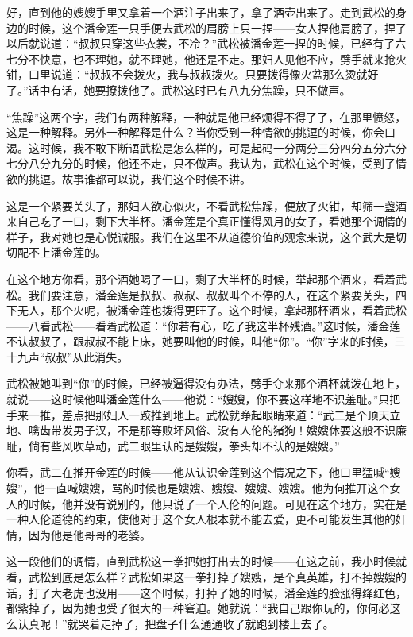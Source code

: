 \par 好，直到他的嫂嫂手里又拿着一个酒注子出来了，拿了酒壶出来了。走到武松的身边的时候，这个潘金莲一只手便去武松的肩膀上只一捏——女人捏他肩膀了，捏了以后就说道：“叔叔只穿这些衣裳，不冷？”武松被潘金莲一捏的时候，已经有了六七分不快意，也不理她，就不理她，他还是不走。那妇人见他不应，劈手就来抢火钳，口里说道：“叔叔不会拨火，我与叔叔拨火。只要拨得像火盆那么烫就好了。”话中有话，她要撩拨他了。武松这时已有八九分焦躁，只不做声。
\par “焦躁”这两个字，我们有两种解释，一种就是他已经烦得不得了了，在那里愤怒，这是一种解释。另外一种解释是什么？当你受到一种情欲的挑逗的时候，你会口渴。这时候，我不敢下断语武松是怎么样的，可是起码一分两分三分四分五分六分七分八分九分的时候，他还不走，只不做声。我认为，武松在这个时候，受到了情欲的挑逗。故事谁都可以说，我们这个时候不讲。
\par 这是一个紧要关头了，那妇人欲心似火，不看武松焦躁，便放了火钳，却筛一盏酒来自己吃了一口，剩下大半杯。潘金莲是个真正懂得风月的女子，看她那个调情的样子，我对她也是心悦诚服。我们在这里不从道德价值的观念来说，这个武大是切切配不上潘金莲的。
\par 在这个地方你看，那个酒她喝了一口，剩了大半杯的时候，举起那个酒来，看着武松。我们要注意，潘金莲是叔叔、叔叔、叔叔叫个不停的人，在这个紧要关头，四下无人，那个火呢，被潘金莲也拨得更旺了。这个时候，拿起那杯酒来，看着武松——八看武松——看着武松道：“你若有心，吃了我这半杯残酒。”这时候，潘金莲不认叔叔了，跟叔叔不能上床，她要叫他的时候，叫他“你”。“你”字来的时候，三十九声“叔叔”从此消失。
\par 武松被她叫到“你”的时候，已经被逼得没有办法，劈手夺来那个酒杯就泼在地上，就说——这时候他叫潘金莲什么——他说：“嫂嫂，你不要这样地不识羞耻。”只把手来一推，差点把那妇人一跤推到地上。武松就睁起眼睛来道：“武二是个顶天立地、噙齿带发男子汉，不是那等败坏风俗、没有人伦的猪狗！嫂嫂休要这般不识廉耻，倘有些风吹草动，武二眼里认的是嫂嫂，拳头却不认的是嫂嫂。”
\par 你看，武二在推开金莲的时候——他从认识金莲到这个情况之下，他口里猛喊“嫂嫂”，他一直喊嫂嫂，骂的时候也是嫂嫂、嫂嫂、嫂嫂、嫂嫂。他为何推开这个女人的时候，他并没有说别的，他只说了一个人伦的问题。可见在这个地方，实在是一种人伦道德的约束，使他对于这个女人根本就不能去爱，更不可能发生其他的奸情，因为他是他哥哥的老婆。
\par 这一段他们的调情，直到武松这一拳把她打出去的时候——在这之前，我小时候就看，武松到底是怎么样？武松如果这一拳打掉了嫂嫂，是个真英雄，打不掉嫂嫂的话，打了大老虎也没用——这个时候，打掉了她的时候，潘金莲的脸涨得绛红色，都紫掉了，因为她也受了很大的一种窘迫。她就说：“我自己跟你玩的，你何必这么认真呢！”就哭着走掉了，把盘子什么通通收了就跑到楼上去了。
